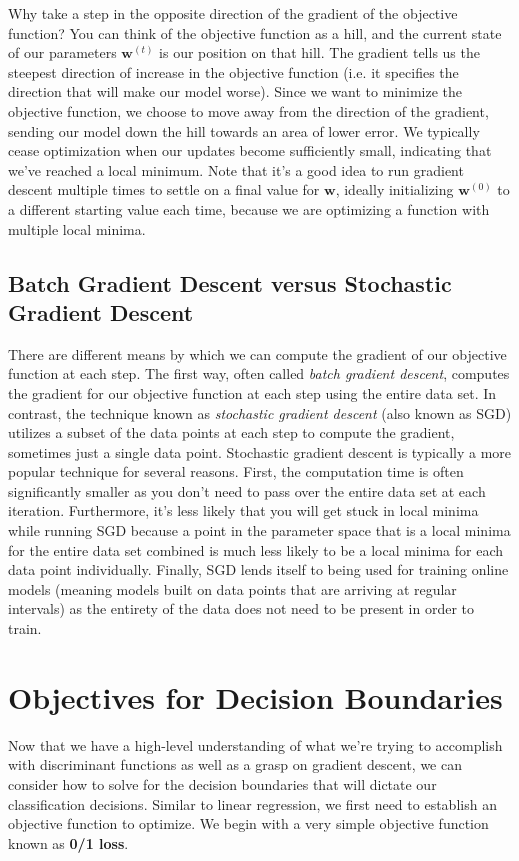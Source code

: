 Why take a step in the opposite direction of the gradient of the objective function? You can think of the objective function as a hill, and the current state of our parameters $\textbf{w}^{(t)}$ is our position on that hill. The gradient tells us the steepest direction of increase in the objective function (i.e. it specifies the direction that will make our model worse). Since we want to minimize the objective function, we choose to move away from the direction of the gradient, sending our model down the hill towards an area of lower error. We typically cease optimization when our updates become sufficiently small, indicating that we've reached a local minimum. Note that it's a good idea to run gradient descent multiple times to settle on a final value for $\textbf{w}$, ideally initializing $\textbf{w}^{(0)}$ to a different starting value each time, because we are optimizing a function with multiple local minima.

\subsection{Batch Gradient Descent versus Stochastic Gradient Descent}
There are different means by which we can compute the gradient of our objective function at each step. The first way, often called \textit{batch gradient descent}, computes the gradient for our objective function at each step using the entire data set. In contrast, the technique known as \textit{stochastic gradient descent} (also known as SGD) utilizes a subset of the data points at each step to compute the gradient, sometimes just a single data point. Stochastic gradient descent is typically a more popular technique for several reasons. First, the computation time is often significantly smaller as you don't need to pass over the entire data set at each iteration. Furthermore, it's less likely that you will get stuck in local minima while running SGD because a point in the parameter space that is a local minima for the entire data set combined is much less likely to be a local minima for each data point individually. Finally, SGD lends itself to being used for training online models (meaning models built on data points that are arriving at regular intervals) as the entirety of the data does not need to be present in order to train.

\section{Objectives for Decision Boundaries}
Now that we have a high-level understanding of what we're trying to accomplish with discriminant functions as well as a grasp on gradient descent, we can consider how to solve for the decision boundaries that will dictate our classification decisions. Similar to linear regression, we first need to establish an objective function to optimize. We begin with a very simple objective function known as \textbf{0/1 loss}.

